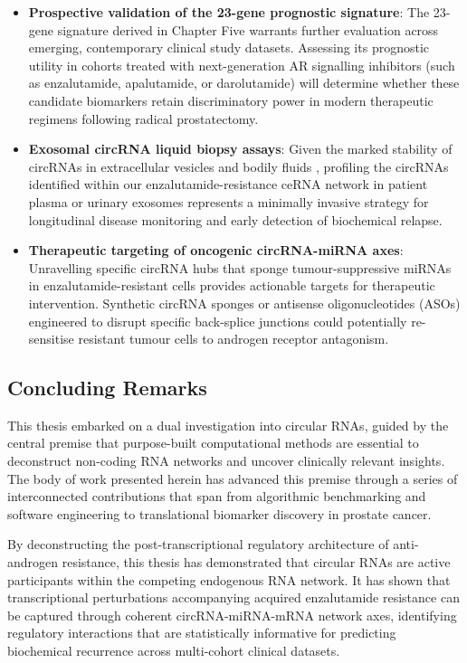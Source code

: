 \begin{itemize}
    \item \textbf{Prospective validation of the 23-gene prognostic signature}: The 23-gene signature derived in Chapter Five warrants further evaluation across emerging, contemporary clinical study datasets. Assessing its prognostic utility in cohorts treated with next-generation AR signalling inhibitors (such as enzalutamide, apalutamide, or darolutamide) will determine whether these candidate biomarkers retain discriminatory power in modern therapeutic regimens following radical prostatectomy.
    
    \item \textbf{Exosomal circRNA liquid biopsy assays}: Given the marked stability of circRNAs in extracellular vesicles and bodily fluids \cite{Li2015Aug, Memczak2015}, profiling the circRNAs identified within our enzalutamide-resistance ceRNA network in patient plasma or urinary exosomes represents a minimally invasive strategy for longitudinal disease monitoring and early detection of biochemical relapse.

    \item \textbf{Therapeutic targeting of oncogenic circRNA-miRNA axes}: Unravelling specific circRNA hubs that sponge tumour-suppressive miRNAs in enzalutamide-resistant cells provides actionable targets for therapeutic intervention. Synthetic circRNA sponges or antisense oligonucleotides (ASOs) engineered to disrupt specific back-splice junctions could potentially re-sensitise resistant tumour cells to androgen receptor antagonism.
\end{itemize}

\subsection{Concluding Remarks}
This thesis embarked on a dual investigation into circular RNAs, guided by the central premise that purpose-built computational methods are essential to deconstruct non-coding RNA networks and uncover clinically relevant insights. The body of work presented herein has advanced this premise through a series of interconnected contributions that span from algorithmic benchmarking and software engineering to translational biomarker discovery in prostate cancer.

By deconstructing the post-transcriptional regulatory architecture of anti-androgen resistance, this thesis has demonstrated that circular RNAs are active participants within the competing endogenous RNA network. It has shown that transcriptional perturbations accompanying acquired enzalutamide resistance can be captured through coherent circRNA-miRNA-mRNA network axes, identifying regulatory interactions that are statistically informative for predicting biochemical recurrence across multi-cohort clinical datasets.

